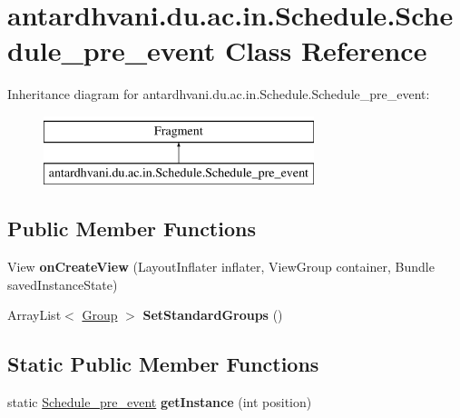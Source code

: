 \hypertarget{classantardhvani_1_1du_1_1ac_1_1in_1_1_schedule_1_1_schedule__pre__event}{}\section{antardhvani.\+du.\+ac.\+in.\+Schedule.\+Schedule\+\_\+pre\+\_\+event Class Reference}
\label{classantardhvani_1_1du_1_1ac_1_1in_1_1_schedule_1_1_schedule__pre__event}
Inheritance diagram for antardhvani.\+du.\+ac.\+in.\+Schedule.\+Schedule\+\_\+pre\+\_\+event\+:\begin{figure}[H]
\begin{center}
\leavevmode
\includegraphics[height=2.000000cm]{classantardhvani_1_1du_1_1ac_1_1in_1_1_schedule_1_1_schedule__pre__event}
\end{center}
\end{figure}
\subsection*{Public Member Functions}
\begin{DoxyCompactItemize}
\item 
\hypertarget{classantardhvani_1_1du_1_1ac_1_1in_1_1_schedule_1_1_schedule__pre__event_a9ec1e9b806c588118b3f8f12b7e36aa0}{}View {\bfseries on\+Create\+View} (Layout\+Inflater inflater, View\+Group container, Bundle saved\+Instance\+State)\label{classantardhvani_1_1du_1_1ac_1_1in_1_1_schedule_1_1_schedule__pre__event_a9ec1e9b806c588118b3f8f12b7e36aa0}

\item 
\hypertarget{classantardhvani_1_1du_1_1ac_1_1in_1_1_schedule_1_1_schedule__pre__event_a0bfa2b9d50b261b1fa60d53e095b7132}{}Array\+List$<$ \hyperlink{classantardhvani_1_1du_1_1ac_1_1in_1_1_adapter_1_1_group}{Group} $>$ {\bfseries Set\+Standard\+Groups} ()\label{classantardhvani_1_1du_1_1ac_1_1in_1_1_schedule_1_1_schedule__pre__event_a0bfa2b9d50b261b1fa60d53e095b7132}

\end{DoxyCompactItemize}
\subsection*{Static Public Member Functions}
\begin{DoxyCompactItemize}
\item 
\hypertarget{classantardhvani_1_1du_1_1ac_1_1in_1_1_schedule_1_1_schedule__pre__event_a2ec382287a23d5d551d8b903f81617c8}{}static \hyperlink{classantardhvani_1_1du_1_1ac_1_1in_1_1_schedule_1_1_schedule__pre__event}{Schedule\+\_\+pre\+\_\+event} {\bfseries get\+Instance} (int position)\label{classantardhvani_1_1du_1_1ac_1_1in_1_1_schedule_1_1_schedule__pre__event_a2ec382287a23d5d551d8b903f81617c8}

\end{DoxyCompactItemize}


